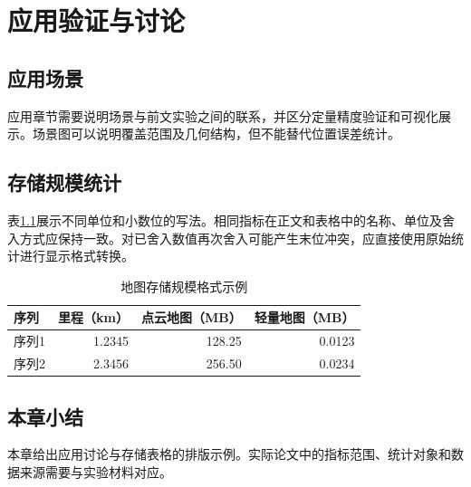 \chapter{应用验证与讨论}\label{chap:application}
\section{应用场景}
应用章节需要说明场景与前文实验之间的联系，并区分定量精度验证和可视化展示。场景图可以说明覆盖范围及几何结构，但不能替代位置误差统计。

\section{存储规模统计}
表\ref{tab:storage}展示不同单位和小数位的写法。相同指标在正文和表格中的名称、单位及舍入方式应保持一致。对已舍入数值再次舍入可能产生末位冲突，应直接使用原始统计进行显示格式转换。

\begin{table}[htbp]
  \centering
  \caption{地图存储规模格式示例}\label{tab:storage}
  \begin{tabular}{@{}lrrr@{}}
    \toprule
    序列 & 里程（km） & 点云地图（MB） & 轻量地图（MB）\\
    \midrule
    序列1 & 1.2345 & 128.25 & 0.0123\\
    序列2 & 2.3456 & 256.50 & 0.0234\\
    \bottomrule
  \end{tabular}
\end{table}

\section{本章小结}
本章给出应用讨论与存储表格的排版示例。实际论文中的指标范围、统计对象和数据来源需要与实验材料对应。
